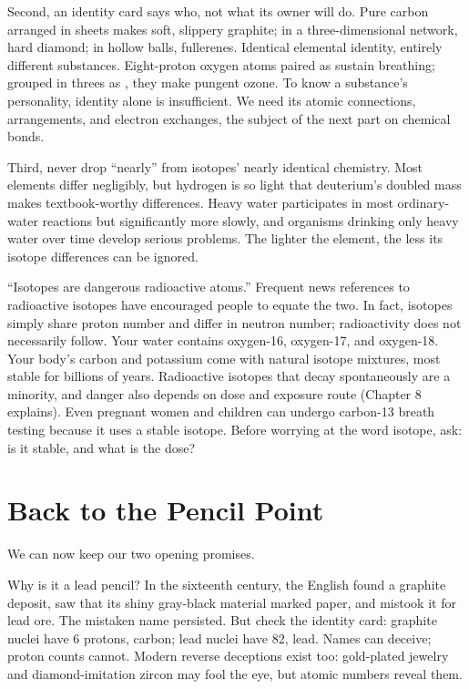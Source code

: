 Second, an identity card says who, not what its owner will do. Pure carbon arranged in sheets makes soft, slippery graphite; in a three-dimensional network, hard diamond; in hollow balls, fullerenes. Identical elemental identity, entirely different substances. Eight-proton oxygen atoms paired as  sustain breathing; grouped in threes as , they make pungent ozone. To know a substance's personality, identity alone is insufficient. We need its atomic connections, arrangements, and electron exchanges, the subject of the next part on chemical bonds.

Third, never drop ``nearly'' from isotopes' nearly identical chemistry. Most elements differ negligibly, but hydrogen is so light that deuterium's doubled mass makes textbook-worthy differences. Heavy water participates in most ordinary-water reactions but significantly more slowly, and organisms drinking only heavy water over time develop serious problems. The lighter the element, the less its isotope differences can be ignored.

\begin{wuqu}
``Isotopes are dangerous radioactive atoms.'' Frequent news references to radioactive isotopes have encouraged people to equate the two. In fact, isotopes simply share proton number and differ in neutron number; radioactivity does not necessarily follow. Your water contains oxygen-16, oxygen-17, and oxygen-18. Your body's carbon and potassium come with natural isotope mixtures, most stable for billions of years. Radioactive isotopes that decay spontaneously are a minority, and danger also depends on dose and exposure route (Chapter 8 explains). Even pregnant women and children can undergo carbon-13 breath testing because it uses a stable isotope. Before worrying at the word isotope, ask: is it stable, and what is the dose?
\end{wuqu}

\section{Back to the Pencil Point}

We can now keep our two opening promises.

Why is it a lead pencil? In the sixteenth century, the English found a graphite deposit, saw that its shiny gray-black material marked paper, and mistook it for lead ore. The mistaken name persisted. But check the identity card: graphite nuclei have 6 protons, carbon; lead nuclei have 82, lead. Names can deceive; proton counts cannot. Modern reverse deceptions exist too: gold-plated jewelry and diamond-imitation zircon may fool the eye, but atomic numbers reveal them.

